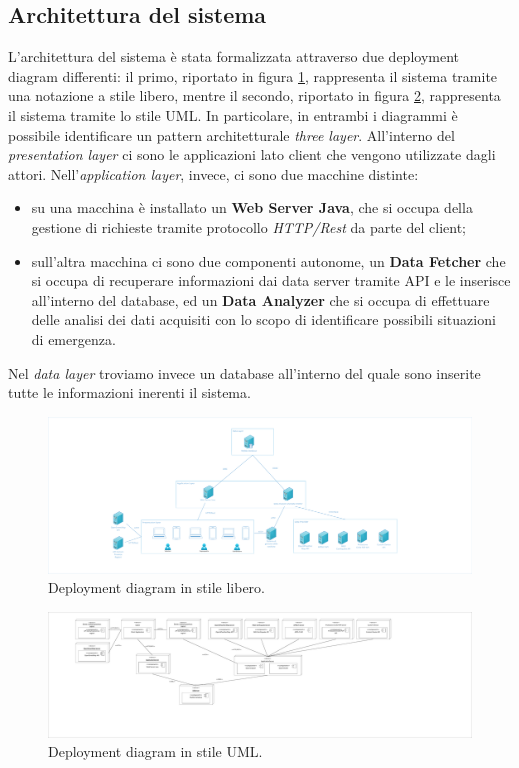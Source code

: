 \clearpage
\subsection{Architettura del sistema}
L'architettura del sistema è stata formalizzata attraverso due deployment diagram differenti: il primo, riportato in figura \ref{fig:DeplymnetDiagramNonFormale}, rappresenta il sistema tramite una notazione a stile libero, mentre il secondo, riportato in figura \ref{fig:DeplymnetDiagramFormale}, rappresenta il sistema tramite lo stile UML. In particolare, in entrambi i diagrammi è possibile identificare un pattern architetturale \textit{three layer}. All'interno del \textit{presentation layer} ci sono le applicazioni lato client che vengono utilizzate dagli attori. Nell'\textit{application layer}, invece, ci sono due macchine distinte:

\begin{itemize}
	\item su una macchina è installato un \textbf{Web Server Java}, che si occupa della gestione di richieste tramite protocollo \textit{HTTP/Rest} da parte del client;
	\item sull'altra macchina ci sono due componenti autonome, un \textbf{Data Fetcher} che si occupa di recuperare informazioni dai data server tramite API e le inserisce all'interno del database, ed un \textbf{Data Analyzer} che si occupa di effettuare delle analisi dei dati acquisiti con lo scopo di identificare possibili situazioni di emergenza.
\end{itemize}

Nel \textit{data layer} troviamo invece un database all'interno del quale sono inserite tutte le informazioni inerenti il sistema.

\begin{figure}
	\centering
	\includegraphics[width=0.9\linewidth]{OtherFiles/DeploymentDiagramNonFormale}
	\caption{Deployment diagram in stile libero.}
	\label{fig:DeplymnetDiagramNonFormale}
\end{figure}

\begin{figure}
	\centering
	\includegraphics[width=0.9\linewidth]{OtherFiles/DeplymentDiagramFormale}
	\caption{Deployment diagram in stile UML.}
	\label{fig:DeplymnetDiagramFormale}
\end{figure}
